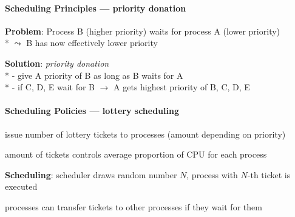 \paragraph{Scheduling Principles --- priority donation}
\begin{items}
  \item \textbf{Problem}: Process B (higher priority) waits for process A (lower priority) \\*
    \( \leadsto \) B has now effectively lower priority
  \item \textbf{Solution}: \emph{priority donation} \\*
    - give A priority of B as long as B waits for A \\*
    - if C, D, E wait for B \( \to \) A gets highest priority of B, C, D, E
\end{items}

\paragraph{Scheduling Policies --- lottery scheduling}
\begin{items}
  \item issue number of lottery tickets to processes (amount depending on priority)
  \item amount of tickets controls average proportion of CPU for each process
  \item \textbf{Scheduling}: scheduler draws random number \( N \), process with \( N \)-th ticket is executed
  \item processes can transfer tickets to other processes if they wait for them
\end{items}